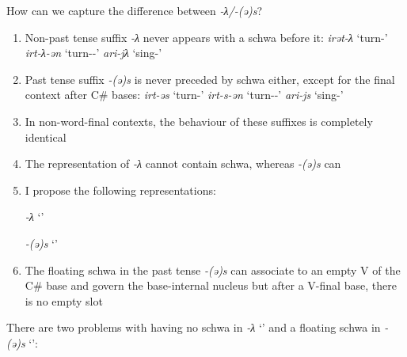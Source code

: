 \documentclass[a4paper, 12pt]{article}
\begin{document}
	How can we capture the difference between \emph{-λ/-(ə)s}?
	\begin{enumerate}[$\gg$]
		\item Non-past tense suffix \emph{-λ} never appears with a schwa before it:
			\pex
				\a \emph{irət-λ} \hfill `turn-{\Npst}'
				\a \emph{irt-λ-ən} \hfill `turn-{\Npst}-{\Ssg}'
				\a \emph{ari-jλ} \hfill `sing-{\Npst}'
			\xe
		\item Past tense suffix \emph{-(ə)s} is never preceded by schwa either, except for the final context after C\# bases:
			\pex
				\a \emph{irt-əs} \hfill `turn-{\Pst}'
				\a \emph{irt-s-ən} \hfill `turn-{\Pst}-{\Ssg}'
				\a \emph{ari-js} \hfill `sing-{\Pst}'
			\xe
		\item In non-word-final contexts, the behaviour of these suffixes is completely identical
		\item The representation of \emph{-λ} cannot contain schwa, whereas \emph{-(ə)s} can
		\item I propose the following representations:
		
\begin{minipage}[t]{.45\linewidth}
			\ex\label{fig:wulijn}\emph{-λ} `{\Npst}' \\
			\xe
\end{minipage}	
\hfill
\begin{minipage}[t]{.45\linewidth}
			\ex\label{fig:wulijn}\emph{-(ə)s} `{\Pst}' \\
			\xe
\end{minipage}	
	\item The floating schwa in the past tense \emph{-(ə)s} can associate to an empty V of the C\# base and govern the base-internal nucleus but after a V-final base, there is no empty slot
	\end{enumerate}
	There are two problems with having no schwa in \emph{-λ} `{\Npst}' and a floating schwa in \emph{-(ə)s} `{\Pst}':
	
\end{document}
